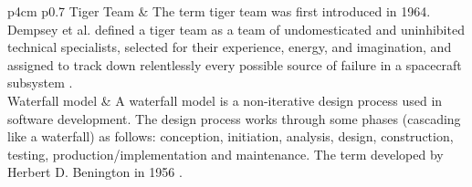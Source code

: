 \begin{longtable}{ p{4cm} p{0.7\linewidth}}
Tiger Team & The term tiger team was first introduced in 1964. Dempsey et al. defined a tiger team as a team of undomesticated and uninhibited technical specialists, selected for their experience, energy, and imagination, and assigned to track down relentlessly every possible source of failure in a spacecraft subsystem \cite{dempsey1964program}. \\

Waterfall model & A waterfall model is a non-iterative design process used in software development. The design process works through some phases (cascading like a waterfall) as follows: conception, initiation, analysis, design, construction, testing, production/implementation and maintenance. The term developed by Herbert D. Benington in 1956 \cite{benington1983production}.\\

\end{longtable}
\newpage
